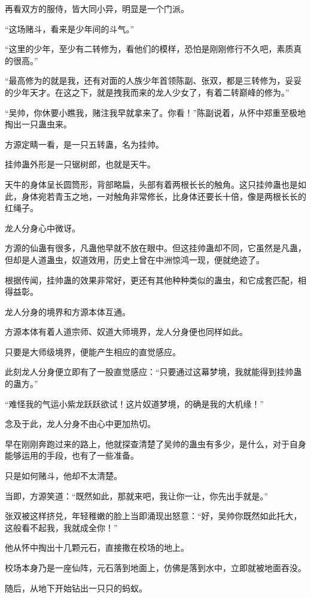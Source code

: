 \begin{this_body}
再看双方的服侍，皆大同小异，明显是一个门派。

“这场赌斗，看来是少年间的斗气。”

“这里的少年，至少有二转修为，看他们的模样，恐怕是刚刚修行不久吧，素质真的很高。”

“最高修为的就是我，还有对面的人族少年首领陈副、张双，都是三转修为，妥妥的少年天才。在这之下，就是拽我而来的龙人少女了，有着二转巅峰的修为。”

“吴帅，你休要小瞧我，赌注我早就拿来了。你看！”陈副说着，从怀中郑重至极地掏出一只蛊虫来。

方源定睛一看，是一只五转蛊，名为挂帅。

挂帅蛊外形是一只锯树郎，也就是天牛。

天牛的身体呈长圆筒形，背部略扁，头部有着两根长长的触角。这只挂帅蛊也是如此，身体宛若青玉之地，一对触角非常修长，比身体还要长十倍，像是两根长长的红绳子。

龙人分身心中微讶。

方源的仙蛊有很多，凡蛊他早就不放在眼中。但这挂帅蛊却不同，它虽然是凡蛊，但却是人道蛊虫，奴道效用，历史上曾在中洲惊鸿一现，便就绝迹了。

根据传闻，挂帅蛊的效果非常好，更还有其他种种类似的蛊虫，和它成套匹配，相得益彰。

龙人分身的境界和方源本体互通。

方源本体有着人道宗师、奴道大师境界，龙人分身便也同样如此。

只要是大师级境界，便能产生相应的直觉感应。

此刻龙人分身便立即有了一股直觉感应：“只要通过这幕梦境，我就能得到挂帅蛊的蛊方。”

“难怪我的气运小紫龙跃跃欲试！这片奴道梦境，的确是我的大机缘！”

念及于此，龙人分身不由心中更加热切。

早在刚刚奔跑过来的路上，他就探查清楚了吴帅的蛊虫有多少，是什么，对于自身能够运用的手段，也有了一些准备。

只是如何赌斗，他却不太清楚。

当即，方源笑道：“既然如此，那就来吧，我让你一让，你先出手就是。”

张双被这样挤兑，年轻稚嫩的脸上当即涌现出怒意：“好，吴帅你既然如此托大，这般看不起我，我就成全你！”

他从怀中掏出十几颗元石，直接撒在校场的地上。

校场本身乃是一座仙阵，元石落到地面上，仿佛是落到水中，立即就被地面吞没。

随后，从地下开始钻出一只只的蚂蚁。


\end{this_body}
